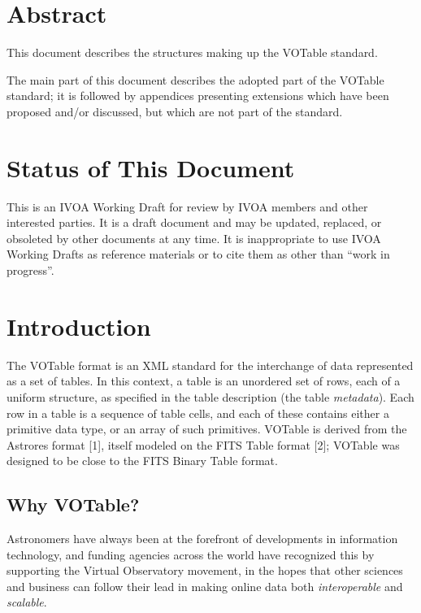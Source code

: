 \section*{Abstract}
This document describes the structures making up
the VOTable standard.

\noindent The main part of this document describes the adopted part of the
VOTable standard; it is followed by appendices presenting extensions
which have been proposed and/or discussed, but which are not part of 
the standard.

\section*{Status of This Document}

This is an IVOA Working Draft for review by IVOA members and other
interested parties.  It is a draft document and may be updated,
replaced, or obsoleted by other documents at any time. It is
inappropriate to use IVOA Working Drafts as reference materials or
to cite them as other than ``work in progress''.

\clearpage
\ifhtx{}\fi
\tableofcontents
\ifhtx{}\fi

\clearpage
\section{Introduction}

The VOTable format is an XML standard for the interchange of data
represented as a set of tables. 
In this context, a table is an unordered set of rows, each of
a uniform structure, as specified in the table description
(the table {\em metadata}). 
Each row in a table is a sequence of table cells, and each of these contains
either a primitive data type, or an array of such primitives. 
VOTable is derived from the
Astrores format [1], itself modeled on the FITS Table format [2];
VOTable was designed to be close to the FITS Binary Table format.

\subsection{Why VOTable?}

Astronomers have always been at the forefront of developments in
information technology, and funding agencies across the world have
recognized this by supporting the Virtual Observatory movement, in
the hopes that other sciences and business can follow their lead in
making online data both {\it interoperable} and {\it scalable}.

